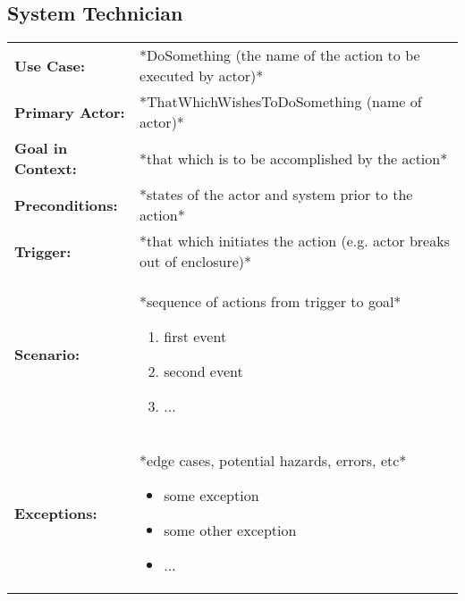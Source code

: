 \documentclass[12pt]{article}
\begin{document}
    
    
    
    \subsection{System Technician}
    \begin{table}[H]
    \begin{tabular}{lp{9.9cm}}
        \hline
        \textbf{Use Case:}                     & *DoSomething (the name of the action to be executed by actor)* \\

        \textbf{Primary Actor:}                & *ThatWhichWishesToDoSomething (name of actor)*\\

        \textbf{Goal in Context:}              & *that which is to be accomplished by the action* \\

        \textbf{Preconditions:}                & *states of the actor and system prior to the action* \\

        \textbf{Trigger:}                      & *that which initiates the action (e.g. actor breaks out of enclosure)*\\

        \textbf{Scenario:}                     & *sequence of actions from trigger to goal*
                                                 \begin{enumerate}
                                                     \item first event
                                                     \item second event
                                                     \item ...
                                                 \end{enumerate} \\

        \textbf{Exceptions:}                   & *edge cases, potential hazards, errors, etc*
                                                 \begin{itemize}
                                                     \item[] some exception
                                                     \item[] some other exception
                                                     \item[] ...
                                                 \end{itemize}\\


\end{tabular}
\end{table}
\end{document}
